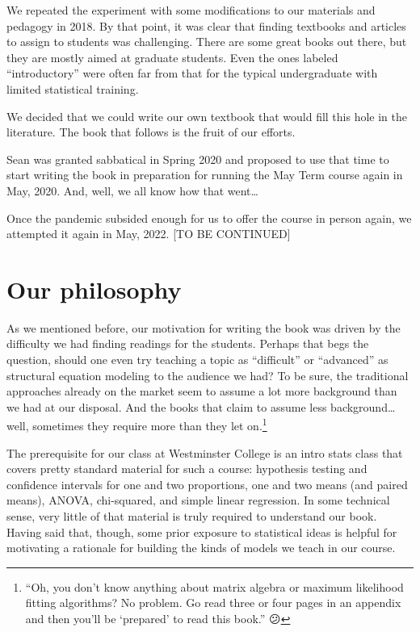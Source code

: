 \documentclass[
]{book}
\begin{document}
We repeated the experiment with some modifications to our materials and pedagogy in 2018. By that point, it was clear that finding textbooks and articles to assign to students was challenging. There are some great books out there, but they are mostly aimed at graduate students. Even the ones labeled ``introductory'' were often far from that for the typical undergraduate with limited statistical training.

We decided that we could write our own textbook that would fill this hole in the literature. The book that follows is the fruit of our efforts.

Sean was granted sabbatical in Spring 2020 and proposed to use that time to start writing the book in preparation for running the May Term course again in May, 2020. And, well, we all know how that went\ldots{}

Once the pandemic subsided enough for us to offer the course in person again, we attempted it again in May, 2022. {[}TO BE CONTINUED{]}

\hypertarget{intro-philosophy}{%
\section*{Our philosophy}\label{intro-philosophy}}

As we mentioned before, our motivation for writing the book was driven by the difficulty we had finding readings for the students. Perhaps that begs the question, should one even try teaching a topic as ``difficult'' or ``advanced'' as structural equation modeling to the audience we had? To be sure, the traditional approaches already on the market seem to assume a lot more background than we had at our disposal. And the books that claim to assume less background\ldots well, sometimes they require more than they let on.\footnote{``Oh, you don't know anything about matrix algebra or maximum likelihood fitting algorithms? No problem. Go read three or four pages in an appendix and then you'll be `prepared' to read this book.'' 😕}

The prerequisite for our class at Westminster College is an intro stats class that covers pretty standard material for such a course: hypothesis testing and confidence intervals for one and two proportions, one and two means (and paired means), ANOVA, chi-squared, and simple linear regression. In some technical sense, very little of that material is truly required to understand our book. Having said that, though, some prior exposure to statistical ideas is helpful for motivating a rationale for building the kinds of models we teach in our course.
\end{document}
